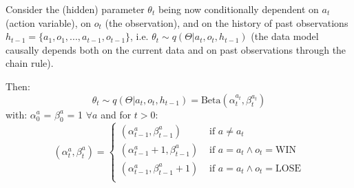 \documentclass[10pt,letterpaper]{article}
\begin{document}
Consider the (hidden) parameter $\theta_t$ being now conditionally dependent on $a_t$ (action variable), on $o_t$ (the observation), and on the history of past observations $h_{t-1} = \{a_1,o_1,...,a_{t-1},o_{t-1}\}$, i.e. $\theta_t \sim  q(\Theta|a_t, o_t, h_{t-1})$ (the data model causally depends both on the current data and on past observations through the chain rule).


Then:
\begin{equation}
    \theta_t \sim q(\Theta|a_t, o_t, h_{t-1})=\text{Beta}(\alpha_t^{a_t},\beta_t^{a_t})
\end{equation}
with:
$\alpha_0^a$ = $\beta_0^a$ = 1 $\forall a$ and for $t>0$:
\begin{equation}
    (\alpha_t^{a},\beta_t^{a}) = \left\{
    \begin{array}{ll}
        (\alpha_{t-1}^a,\beta_{t-1}^a) & \mbox{ if } a\neq a_t  \\
        (\alpha^a_{t-1}+1,\beta^a_{t-1}) & \mbox{ if } a=a_t \wedge o_t=\text{WIN} \\
        (\alpha^a_{t-1},\beta^a_{t-1}+1) & \mbox{ if } a=a_t \wedge o_t=\text{LOSE} \\
    \end{array}
\right.
\end{equation}








\end{document}
